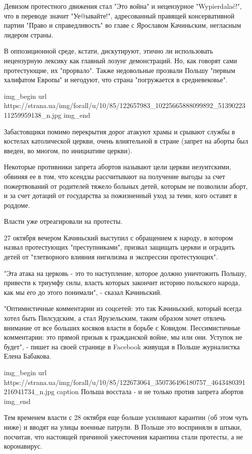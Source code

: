 Девизом протестного движения стал "Это война" и нецензурное "Wypierdalać!", что
в переводе значит "Уе@ывайте!", адресованный правящей консервативной партии
"Право и справедливость" во главе с Ярославом Качиньским, негласным лидером
страны.

В оппозиционной среде, кстати, дискутируют, этично ли использовать нецензурную
лексику как главный лозунг демонстраций. Но, как говорят сами протестующие, их
"прорвало". Также недовольные прозвали Польшу "первым халифатом Европы" и
негодуют, что страна "погружается в средневековье".

\ifcmt
img_begin 
  url https://strana.ua/img/forall/u/10/85/122657983_10225665888099892_5139022311259959138_n.jpg
img_end
\fi

Забастовщики помимо перекрытия дорог атакуют храмы и срывают службы в костелах
католической церкви, очень влиятельной в стране (запрет на аборты был введен,
во многом, по инициативе церкви).

Некоторые противники запрета абортов называют цели церкви иезуитскими, обвиняя
ее в том, что ксендзы рассчитывают на получение выгоды за счет пожертвований от
родителей тяжело больных детей, которым не позволили аборт, и за счет дотаций
от государства за пожизненный уход за теми, кого оставят в роддоме.

Власти уже отреагировали на протесты. 

27 октября вечером Качиньский выступил с обращением к народу, в котором назвал
протестующих "преступниками", призвал защищать церкви и оградить детей от
"тлетворного влияния нигилизма и экспрессии протестующих".

"Эта атака на церковь - это то наступление, которое должно уничтожить Польшу,
привести к триумфу силы, власть которых закончит историю польского народа, как
мы его до этого понимали", - сказал Качиньский.

"Оптимистичные комментарии из соцсетей: это так Качиньский, который всегда
хотел быть Пилсудским, а стал Ярузельским, таким образом хочет отвлечь внимание
от все больших косяков власти в борьбе с Ковидом. Пессимистичные комментарии:
это прямой призыв к гражданской войне, мы или они. Уступок не будет", - пишет
на своей странице в Facebook живущая в Польше журналистка Елена Бабакова.

\ifcmt
img_begin 
  url https://strana.ua/img/forall/u/10/85/122673064_350736496180757_4643480391216941734_n.jpg
  caption Польша восстала - и не только против запрета абортов
img_end
\fi

Тем временем власти с 28 октября еще больше усиливают карантин (об этом чуть
ниже) и вводят на улицы военные патрули. В Польше это восприняли в штыки,
посчитав, что настоящей причиной ужесточения карантина стали протесты, а не
коронавирус. 

